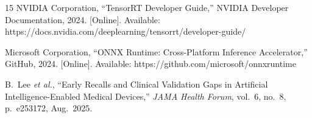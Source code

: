 \documentclass[journal,10pt,twocolumn]{IEEEtran}
\begin{document}
\begin{thebibliography}{15}
NVIDIA Corporation, ``TensorRT Developer Guide,'' NVIDIA Developer
Documentation, 2024. [Online]. Available:
https://docs.nvidia.com/deeplearning/tensorrt/developer-guide/

Microsoft Corporation, ``ONNX Runtime: Cross-Platform Inference
Accelerator,'' GitHub, 2024. [Online]. Available:
https://github.com/microsoft/onnxruntime

B.~Lee \emph{et al.},
``Early Recalls and Clinical Validation Gaps in Artificial
Intelligence-Enabled Medical Devices,''
\emph{JAMA Health Forum}, vol.~6, no.~8, p.~e253172, Aug.\ 2025.

\end{thebibliography}
\end{document}
